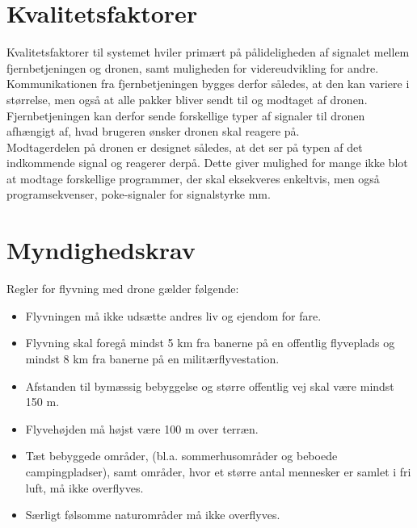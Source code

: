 \documentclass[Main]{subfiles}
\begin{document}
\chapter{Kvalitetsfaktorer}
Kvalitetsfaktorer til systemet hviler primært på pålideligheden af signalet mellem fjernbetjeningen og dronen, samt muligheden for videreudvikling for andre.
\\
Kommunikationen fra fjernbetjeningen bygges derfor således, at den kan variere i størrelse, men også at alle pakker bliver sendt til og modtaget af dronen.
Fjernbetjeningen kan derfor sende forskellige typer af signaler til dronen afhængigt af, hvad brugeren ønsker dronen skal reagere på.
\\
Modtagerdelen på dronen er designet således, at det ser på typen af det indkommende signal og reagerer derpå.
Dette giver mulighed for mange ikke blot at modtage forskellige programmer, der skal eksekveres enkeltvis, men også programsekvenser, poke-signaler for signalstyrke mm.











\chapter{Myndighedskrav}
Regler for flyvning med drone gælder følgende:

\begin{itemize}
\item Flyvningen må ikke udsætte andres liv og ejendom for fare\cite[s. 1]{Lov1}.
\item Flyvning skal foregå mindst 5 km fra banerne på en offentlig flyveplads og mindst 8 km fra banerne på en militærflyvestation\cite[s. 1]{Lov1}.
\item Afstanden til bymæssig bebyggelse og større offentlig vej skal være mindst 150 m\cite[s. 1]{Lov1}.
\item Flyvehøjden må højst være 100 m over terræn\cite[s. 2]{Lov1}.
\item Tæt bebyggede områder, (bl.a. sommerhusområder og beboede campingpladser), samt områder, hvor et større antal mennesker er samlet i fri luft, må ikke overflyves\cite[s. 2]{Lov1}.
\item Særligt følsomme naturområder må ikke overflyves\cite[s. 2]{Lov1}.
\end{itemize} 
\end{document}
